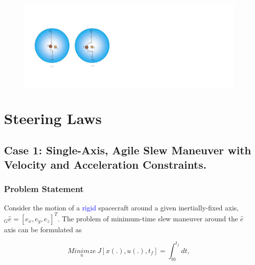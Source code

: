 \documentclass[letterpaper, preprint, paper,11pt]{AAS}	%
\begin{document}
	
	\begin{figure}[H]
		\begin{center}
			\includegraphics[width=6in]{./Figures/SASSchematic3}
		\end{center}
	\end{figure}
	
	
	\section{Steering Laws} 
	
	\subsection{Case 1: Single-Axis, Agile Slew Maneuver with Velocity and Acceleration Constraints.}	 
	
	
	\subsubsection{Problem Statement}
	
	Consider the motion of a \textcolor{blue}{rigid} spacecraft around a given inertially-fixed axis, $_G\hat{e}=[e_x,e_y,e_z]^T$. The problem of minimum-time slew maneuver around the $\hat{e}$ axis can be formulated as
	
	\begin{equation}\label{costfunction}
	\underset{u}{Minimze}\ J[x(.), u(.), t_f]=\int_{t0}^{t_f} dt,
	\end{equation}
	
\end{document}
